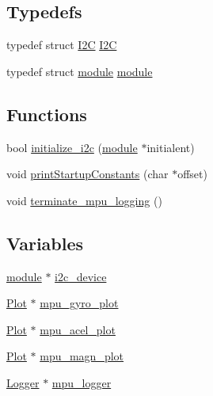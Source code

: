 \subsection*{Typedefs}
\begin{DoxyCompactItemize}
\item 
typedef struct \hyperlink{structI2C}{I2C} \hyperlink{i2c-interface_8h_af97e2ed8f7882390b1a60413d47db29a}{I2C}
\item 
typedef struct \hyperlink{structmodule}{module} \hyperlink{i2c-interface_8h_ae4419133e617ca792ba6419b38c7de46}{module}
\end{DoxyCompactItemize}
\subsection*{Functions}
\begin{DoxyCompactItemize}
\item 
bool \hyperlink{i2c-interface_8h_a8eb11c031b9484a01fd8b263c13373cf}{initialize\+\_\+i2c} (\hyperlink{structmodule}{module} $\ast$initialent)
\item 
void \hyperlink{i2c-interface_8h_a7584f35073e31c1833be60c696482e9a}{print\+Startup\+Constants} (char $\ast$offset)
\item 
void \hyperlink{i2c-interface_8h_a3644aefb56a2169f316b0f2510ffc56c}{terminate\+\_\+mpu\+\_\+logging} ()
\end{DoxyCompactItemize}
\subsection*{Variables}
\begin{DoxyCompactItemize}
\item 
\hyperlink{structmodule}{module} $\ast$ \hyperlink{i2c-interface_8h_acd042cf29b1aea09dcee3109a54c7aae}{i2c\+\_\+device}
\item 
\hyperlink{structPlot}{Plot} $\ast$ \hyperlink{i2c-interface_8h_a36722da387ca1bab15cfa4e08b4a0adf}{mpu\+\_\+gyro\+\_\+plot}
\item 
\hyperlink{structPlot}{Plot} $\ast$ \hyperlink{i2c-interface_8h_ae50116ef22b80c4e5901b77ae7566486}{mpu\+\_\+acel\+\_\+plot}
\item 
\hyperlink{structPlot}{Plot} $\ast$ \hyperlink{i2c-interface_8h_a448157b39be892129c8648d6b0341d3c}{mpu\+\_\+magn\+\_\+plot}
\item 
\hyperlink{structLogger}{Logger} $\ast$ \hyperlink{i2c-interface_8h_a77d5c074468038efddc780f70a777a1e}{mpu\+\_\+logger}
\end{DoxyCompactItemize}


